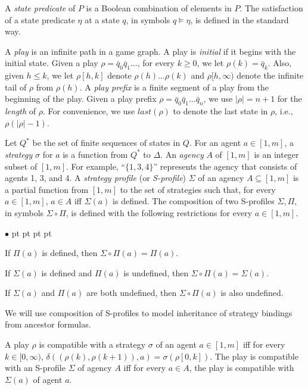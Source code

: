 \documentclass[11pt]{article}
\newcommand{\emstp}{\textit{SP}}
\newcommand{\emlast}{\textit{last}}
\newenvironment{list1}{\begin{list}{$\bullet$}
{\topsep 0 pt \parsep 0 pt \partopsep 0 pt \itemsep 0 pt}}{\end{list}}
\begin{document}
A {\em state predicate} of $P$ is a Boolean combination of elements in $P$.
The satisfaction of a state predicate $\eta$ at a state $q$,
in symbols $q\models \eta$, is defined in the standard way.

A {\em play} is an infinite path in a game graph.
A play is {\em initial} if it begins with the initial state.
Given a play $\rho=\bar{q}_0\bar{q}_1\ldots$,
for every $k\geq 0$, we let $\rho(k)=\bar{q}_k$.
Also, given $h\leq k$,
we let $\rho[h,k]$ denote $\rho(h)\ldots\rho(k)$ and
$\rho[h,\infty)$ denote the infinite tail of $\rho$
from $\rho(h)$.
A {\em play prefix} is a finite segment of a play from the beginning of
the play.
Given a play prefix $\rho=\bar{q}_0\bar{q}_1\ldots \bar{q}_n$, 
we use $|\rho|=n+1$ for the {\em length} of $\rho$.
For convenience, we use $\emlast(\rho)$ to denote the 
last state in $\rho$, i.e., $\rho(|\rho|-1)$.  

Let $Q^*$ be the set of finite sequences of states in $Q$.  
For an agent $a\in [1,m]$,
a {\em strategy} $\sigma$ for $a$ is
a function from $Q^*$ to $\Delta$.
An {\em agency} $A$ of $[1,m]$ is an integer subset of $[1,m]$.  
For example, ``$\{1,3,4\}$'' represents the agency that consists of agents 1, 3, and 4. 
A {\em strategy profile} (or {\em S-profile}) $\Sigma$ of 
an agency $A\subseteq [1,m]$ 
is a partial function from $[1,m]$ to the set of strategies
such that, for every $a\in[1,m]$, 
$a\in A$ iff %
$\Sigma(a)$ is defined.  
The composition of two S-profiles $\Sigma,\Pi$,
in symbols $\Sigma\circ\Pi$, is defined with
the following restrictions for every $a\in[1,m]$.
\begin{list1}
\item If $\Pi(a)$ is defined,
    then $\Sigma\circ\Pi(a)=\Pi(a)$.
\item If $\Sigma(a)$ is defined and $\Pi(a)$ is undefined,
    then $\Sigma\circ\Pi(a)=\Sigma(a)$.
\item If $\Sigma(a)$ and $\Pi(a)$ are both undefined,
    then $\Sigma\circ\Pi(a)$ is also undefined.
\end{list1} 
We will use composition of S-profiles to model 
inheritance of strategy bindings from ancestor formulas. 

A play $\rho$ is compatible with a strategy
$\sigma$ of an agent $a\in [1,m]$
iff for every $k\in [0,\infty)$,
$\delta((\rho(k),\rho(k+1)),a)=\sigma(\rho[0,k])$.
The play is compatible with an S-profile $\Sigma$ of agency $A$
iff for every $a\in A$,\label{reply2.M2A} 
the play is compatible with $\Sigma(a)$ of agent $a$.
\end{document}
